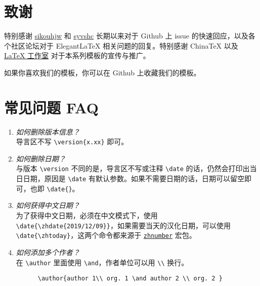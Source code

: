 \documentclass[cn,hazy,blue,14pt,screen]{elegantnote}
\begin{document}
\section{致谢}

特别感谢 \href{https://github.com/sikouhjw}{sikouhjw} 和 \href{https://github.com/syvshc}{syvshc}  长期以来对于 Github 上 issue 的快速回应，以及各个社区论坛对于 Elegant\LaTeX{} 相关问题的回复。特别感谢 China\TeX{} 以及 \href{http://www.latexstudio.net/}{\LaTeX{} 工作室} 对于本系列模板的宣传与推广。

如果你喜欢我们的模板，你可以在 Github 上收藏我们的模板。

\section{常见问题 FAQ}

\begin{enumerate}[label=\arabic*).]
  \item \textit{如何删除版本信息？}\\
    导言区不写 \lstinline|\version{x.xx}| 即可。
  \item \textit{如何删除日期？}\\
    与版本 \lstinline{\version} 不同的是，导言区不写或注释 \lstinline{\date} 的话，仍然会打印出当日日期，原因是 \lstinline{\date} 有默认参数。如果不需要日期的话，日期可以留空即可，也即 \lstinline|\date{}|。
  \item \textit{如何获得中文日期？}\\
    为了获得中文日期，必须在中文模式下，使用 \lstinline|\date{\zhdate{2019/12/09}}|，如果需要当天的汉化日期，可以使用 \lstinline|\date{\zhtoday}|，这两个命令都来源于 \href{https://ctan.org/pkg/zhnumber}{\lstinline{zhnumber}} 宏包。
  \item \textit{如何添加多个作者？}\\
    在 \lstinline{\author} 里面使用 \lstinline{\and}，作者单位可以用 \lstinline{\\} 换行。
    \begin{lstlisting}
      \author{author 1\\ org. 1 \and author 2 \\ org. 2 }
    \end{lstlisting}
\end{enumerate}

\end{document}
